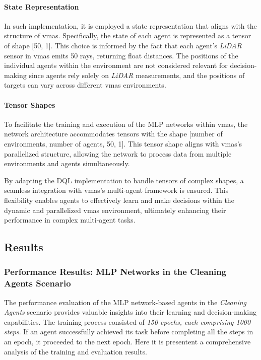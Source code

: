 \documentclass[12pt,a4paper,openright,twoside]{book}
\begin{document}
\paragraph{State Representation}

In such implementation, it is employed a state representation that aligns with the structure of \ac{vmas}. Specifically, the state of each agent is represented as a tensor of shape [50, 1]. This choice is informed by the fact that each agent's \emph{LiDAR} sensor in \ac{vmas} emits 50 rays, returning float distances. The positions of the individual agents within the environment are not considered relevant for decision-making since agents rely solely on \emph{LiDAR} measurements, and the positions of targets can vary across different \ac{vmas} environments.

\paragraph{Tensor Shapes}

To facilitate the training and execution of the MLP networks within \ac{vmas}, the network architecture accommodates tensors with the shape [number of environments, number of agents, 50, 1]. This tensor shape aligns with \ac{vmas}'s parallelized structure, allowing the network to process data from multiple environments and agents simultaneously.

By adapting the DQL implementation to handle tensors of complex shapes, a seamless integration with \ac{vmas}'s multi-agent framework is ensured. This flexibility enables agents to effectively learn and make decisions within the dynamic and parallelized \ac{vmas} environment, ultimately enhancing their performance in complex multi-agent tasks.

\newpage

\subsection{Results}
\subsubsection{Performance Results: MLP Networks in the Cleaning Agents Scenario}

The performance evaluation of the MLP network-based agents in the \emph{Cleaning Agents} scenario provides valuable insights into their learning and decision-making capabilities. The training process consisted of \emph{150 epochs, each comprising 1000 steps}. If an agent successfully achieved its task before completing all the steps in an epoch, it proceeded to the next epoch. Here it is presentent a comprehensive analysis of the training and evaluation results.
\end{document}
